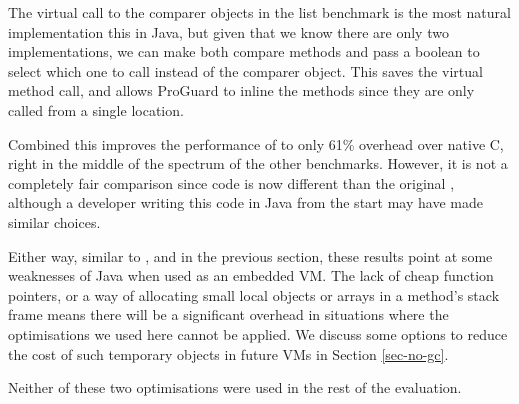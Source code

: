 The virtual call to the comparer objects in the list benchmark is the most natural implementation this in Java, but given that we know there are only two implementations, we can make both compare methods  and pass a boolean to select which one to call instead of the comparer object. This saves the virtual method call, and allows ProGuard to inline the methods since they are only called from a single location.

Combined this improves the performance of  to only 61\% overhead over native C, right in the middle of the spectrum of the other benchmarks. However, it is not a completely fair comparison since code is now different than the original , although a developer writing this code in Java from the start may have made similar choices.

Either way, similar to ,  and  in the previous section, these results point at some weaknesses of Java when used as an embedded VM. The lack of cheap function pointers, or a way of allocating small local objects or arrays in a method's stack frame means there will be a significant overhead in situations where the optimisations we used here cannot be applied. We discuss some options to reduce the cost of such temporary objects in future VMs in Section \ref{sec-no-gc}.

Neither of these two optimisations were used in the rest of the evaluation.


















